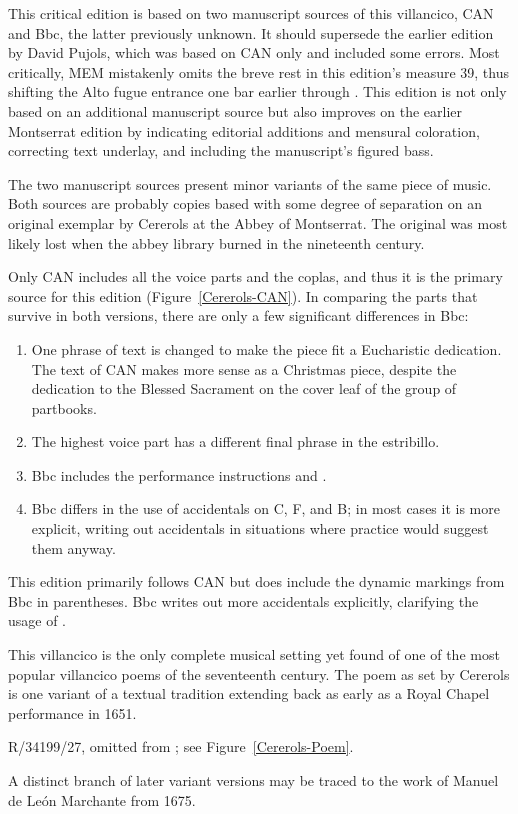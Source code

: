 This critical edition is based on two manuscript sources of this villancico, 
CAN and Bbc, the latter previously unknown.
It should supersede the earlier edition by David Pujols, which was based on CAN
only and included some errors.
Most critically, MEM mistakenly omits the breve rest in this edition's measure 
39, thus shifting the Alto fugue entrance one bar earlier through .
This edition is not only based on an additional manuscript source but also 
improves on the earlier Montserrat edition by indicating editorial additions 
and mensural coloration, correcting text underlay, and including the 
manuscript's figured bass.

The two manuscript sources present minor variants of the same piece of music.
Both sources are probably copies based with some degree of separation on an 
original exemplar by Cererols at the Abbey of Montserrat.
The original was most likely lost when the abbey library burned in the 
nineteenth century.

Only CAN includes all the voice parts and the coplas, and thus it is the 
primary source for this edition (Figure~\ref{Cererols-CAN}).%
  \autocite[60--61]{Bonastre:CanetCatalog}
In comparing the parts that survive in both versions, there are only a few 
significant differences in Bbc: 
\begin{enumerate}
    \item One phrase of text is changed to make the piece fit a Eucharistic
        dedication.  
        The text of CAN makes more sense as a Christmas piece, despite the
        dedication to the Blessed Sacrament on the cover leaf of the group of
        partbooks.
    \item The highest voice part has a different final phrase in the estribillo.
    \item Bbc includes the performance instructions  and .
    \item Bbc differs in the use of accidentals on C, F, and B; in most cases
        it is more explicit, writing out accidentals in situations where
         practice would suggest them anyway.
\end{enumerate}
This edition primarily follows CAN but does include the dynamic markings from 
Bbc in parentheses.
Bbc writes out more accidentals explicitly, clarifying the usage of .



This villancico is the only complete musical setting yet found of one of the 
most popular villancico poems of the seventeenth century.
The poem as set by Cererols is one variant of a textual tradition extending 
back as early as a Royal Chapel performance in 1651.%
\begin{Footnote}
    \signature{E-Mn}{R/34199/27}, omitted from \autocite{BNE:VCs17C}; see
    Figure~\ref{Cererols-Poem}.
\end{Footnote}
A distinct branch of later variant versions may be traced to the work of Manuel 
de León Marchante from 1675.


